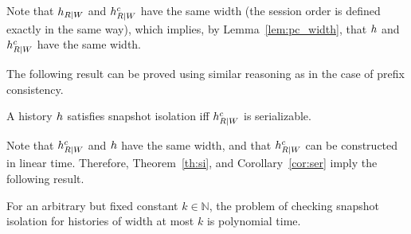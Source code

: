 Note that ${h}_{R|W}$ and ${h}_{R|W}^c$ have the same width (the session order is defined exactly in the same way), which implies, by Lemma~\ref{lem:pc_width}, that ${h}$ and ${h}_{R|W}^c$ have the same width.

The following result can be proved using similar reasoning as in the case of prefix consistency. %

\begin{theorem}\label{th:si}
A history ${h}$ satisfies snapshot isolation iff ${h}_{R|W}^c$ is serializable.
\end{theorem}

Note that ${h}_{R|W}^c$ and ${h}$ have the same width, and that ${h}_{R|W}^c$ can be constructed in linear time. Therefore, Theorem~\ref{th:si}, and Corollary~\ref{cor:ser} imply the following result.
 
 \begin{corollary}\label{cor:si}
For an arbitrary but fixed constant $k\in\mathbb{N}$, the problem of checking snapshot isolation for histories of width at most $k$ is polynomial time.
 
 \end{corollary}


